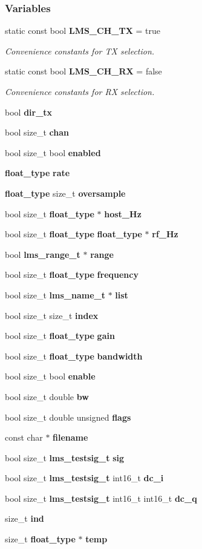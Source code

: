 \subsubsection*{Variables}
\begin{DoxyCompactItemize}
\item 
static const bool {\bf L\+M\+S\+\_\+\+C\+H\+\_\+\+TX} = true
\begin{DoxyCompactList}\small\item\em Convenience constants for TX selection. \end{DoxyCompactList}\item 
static const bool {\bf L\+M\+S\+\_\+\+C\+H\+\_\+\+RX} = false
\begin{DoxyCompactList}\small\item\em Convenience constants for RX selection. \end{DoxyCompactList}\item 
bool {\bf dir\+\_\+tx}
\item 
bool size\+\_\+t {\bf chan}
\item 
bool size\+\_\+t bool {\bf enabled}
\item 
{\bf float\+\_\+type} {\bf rate}
\item 
{\bf float\+\_\+type} size\+\_\+t {\bf oversample}
\item 
bool size\+\_\+t {\bf float\+\_\+type} $\ast$ {\bf host\+\_\+\+Hz}
\item 
bool size\+\_\+t {\bf float\+\_\+type} {\bf float\+\_\+type} $\ast$ {\bf rf\+\_\+\+Hz}
\item 
bool {\bf lms\+\_\+range\+\_\+t} $\ast$ {\bf range}
\item 
bool size\+\_\+t {\bf float\+\_\+type} {\bf frequency}
\item 
bool size\+\_\+t {\bf lms\+\_\+name\+\_\+t} $\ast$ {\bf list}
\item 
bool size\+\_\+t size\+\_\+t {\bf index}
\item 
bool size\+\_\+t {\bf float\+\_\+type} {\bf gain}
\item 
bool size\+\_\+t {\bf float\+\_\+type} {\bf bandwidth}
\item 
bool size\+\_\+t bool {\bf enable}
\item 
bool size\+\_\+t double {\bf bw}
\item 
bool size\+\_\+t double unsigned {\bf flags}
\item 
const char $\ast$ {\bf filename}
\item 
bool size\+\_\+t {\bf lms\+\_\+testsig\+\_\+t} {\bf sig}
\item 
bool size\+\_\+t {\bf lms\+\_\+testsig\+\_\+t} int16\+\_\+t {\bf dc\+\_\+i}
\item 
bool size\+\_\+t {\bf lms\+\_\+testsig\+\_\+t} int16\+\_\+t int16\+\_\+t {\bf dc\+\_\+q}
\item 
size\+\_\+t {\bf ind}
\item 
size\+\_\+t {\bf float\+\_\+type} $\ast$ {\bf temp}
\end{DoxyCompactItemize}


